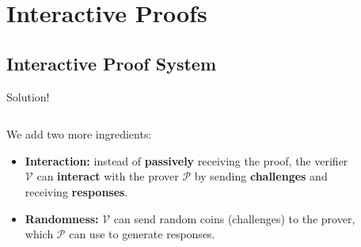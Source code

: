 \documentclass[xcolor={usenames,dvipsnames}]{beamer}
\begin{document}
    \section{Interactive Proofs}

    \subsection{Interactive Proof System}
    \begin{frame}{Solution!}
        \begin{columns}
            \begin{column}{0.4\textwidth}
                We add two more ingredients:
                \begin{itemize}
                    \item \textbf{Interaction:} instead of \textbf{passively} receiving the proof, the verifier $\mathcal{V}$ can \textbf{interact} with the prover $\mathcal{P}$ by sending \textbf{challenges} and receiving \textbf{responses}.
                    \item \textbf{Randomness:} $\mathcal{V}$ can send random coins (challenges) to the prover, which $\mathcal{P}$ can use to generate responses.
                \end{itemize}
            \end{column}
            \begin{column}{0.6\textwidth}
                \begin{figure}
                    \centering
\end{figure}
\end{column}
\end{columns}
\end{frame}
\end{document}
